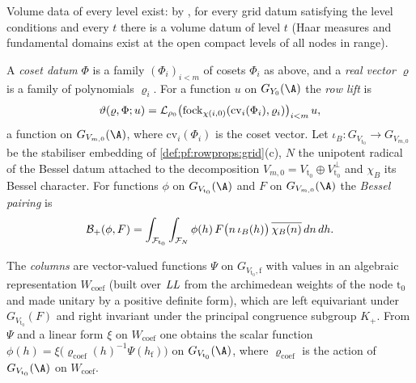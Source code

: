 Volume data of every level exist: by , for every grid datum satisfying the
level conditions and every $t$ there is a volume datum of level $t$ (Haar measures and fundamental domains exist at the
open compact levels of all nodes in range).

\begin{definition}\label{def:pf:rowprops:bessel}
A \emph{coset datum} $\Phi$ is a family $(\Phi_i)_{i<m}$ of cosets $\Phi_i$ as above, and a \emph{real vector} $\varrho$
is a family of polynomials $\varrho_i$. For a function $u$ on $G_{Y_0}(\A)$ the \emph{row lift} is
\[
\vartheta(\varrho,\Phi;u)=\mathcal{L}_{\rho_0}\bigl(\mathrm{fock}_{\chi(i,0)}(\mathrm{cv}_i(\Phi_i),\varrho_i)\bigr)_{i<m}\,u,
\]
a function on $G_{V_{m,0}}(\A)$, where $\mathrm{cv}_i(\Phi_i)$ is the coset vector. Let $\iota_B:G_{V_{\mathrm t_0}}\to
G_{V_{m,0}}$ be the stabiliser embedding of \cref{def:pf:rowprops:grid}(c), $N$ the unipotent radical of the Bessel
datum attached to the decomposition $V_{m,0}=V_{\mathrm t_0}\oplus V_{\mathrm t_0}^\perp$ and $\chi_B$ its Bessel
character. For functions $\phi$ on $G_{V_{\mathrm t_0}}(\A)$ and $F$ on $G_{V_{m,0}}(\A)$ the \emph{Bessel pairing} is
\begin{equation}\label{eq:pf:rowprops:bessel}
\mathcal{B}_+(\phi,F)=\int_{\mathcal{F}_{\mathrm t_0}}\int_{\mathcal{F}_N}\phi(h)\,F\bigl(n\,\iota_B(h)\bigr)\,
\overline{\chi_B(n)}\,dn\,dh .
\end{equation}
\end{definition}

\begin{definition}[Columns]\label{def:pf:rowprops:columns}
The \emph{columns} are vector-valued functions $\Psi$ on $G_{V_{\mathrm t_0},\mathrm f}$ with values in an
algebraic representation $W_{\mathrm{coef}}$ (built over $\mathit{LL}$ from the archimedean weights of the node
$\mathrm t_0$ and made unitary by a positive definite form), which are left equivariant under $G_{V_{\mathrm
t_0}}(F)$ and right invariant under the principal congruence subgroup $K_+$. From $\Psi$ and a linear form $\xi$ on
$W_{\mathrm{coef}}$ one obtains the scalar function $\phi(h)=\xi\bigl(\varrho_{\mathrm{coef}}(h)^{-1}\Psi(h_{\mathrm f})\bigr)$ on
$G_{V_{\mathrm t_0}}(\A)$, where $\varrho_{\mathrm{coef}}$ is the action of $G_{V_{\mathrm t_0}}(\A)$ on $W_{\mathrm{coef}}$.
\end{definition}


